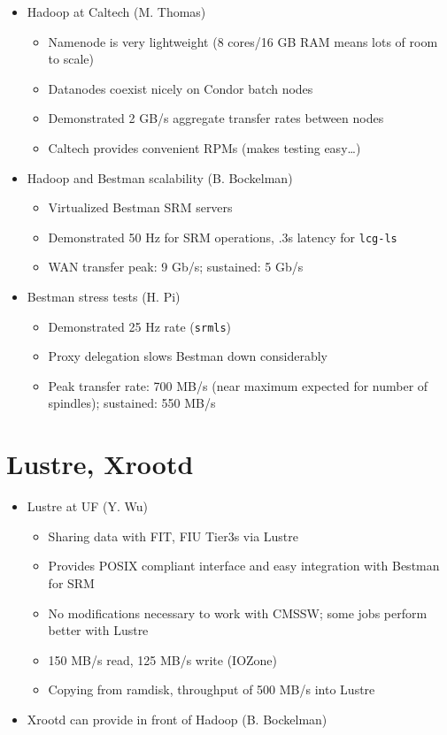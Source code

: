 \documentclass{beamer}
\begin{document}
\begin{frame}
\begin{itemize}
	\item Hadoop at Caltech (M. Thomas)
	\begin{itemize}
		\item Namenode is very lightweight (8 cores/16 GB RAM means lots of room to scale)
		\item Datanodes coexist nicely on Condor batch nodes
		\item Demonstrated 2 GB/s aggregate transfer rates between nodes
		\item Caltech provides convenient RPMs (makes testing easy\ldots{})
	\end{itemize}
	\item Hadoop and Bestman scalability (B. Bockelman)
	\begin{itemize}
		\item Virtualized Bestman SRM servers
		\item Demonstrated 50 Hz for SRM operations, .3s latency for {\tt lcg-ls}
		\item WAN transfer peak: 9 Gb/s; sustained: 5 Gb/s
	\end{itemize}
	\item Bestman stress tests (H. Pi)
	\begin{itemize}
		\item Demonstrated 25 Hz rate ({\tt srmls})
		\item Proxy delegation slows Bestman down considerably
		\item Peak transfer rate: 700 MB/s (near maximum expected for number of spindles); sustained: 550 MB/s
	\end{itemize}
\end{itemize}
\end{frame}

\section{Lustre, Xrootd}

\begin{frame}
\begin{itemize}
	\item Lustre at UF (Y. Wu)
	\begin{itemize}
		\item Sharing data with FIT, FIU Tier3s via Lustre
		\item Provides POSIX compliant interface and easy integration with Bestman for SRM
		\item No modifications necessary to work with CMSSW; some jobs perform better with Lustre
		\item 150 MB/s read, 125 MB/s write (IOZone)
		\item Copying from ramdisk, throughput of 500 MB/s into Lustre
	\end{itemize}
	\item Xrootd can provide in front of Hadoop (B. Bockelman)
\end{itemize}
\end{frame}
\end{document}
